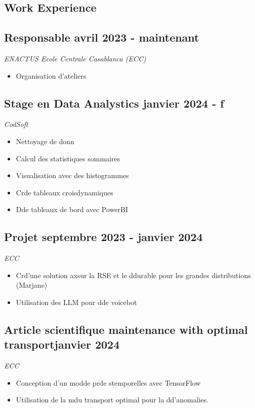\documentclass[a4paper,10pt]{article}
\begin{document}
\begin{multicols}{2}
\section*{ Work Experience}

\subsection*{Responsable \ufffdv\ufffdnementiel \hfill avril 2023 - maintenant}
\textit{ENACTUS Ecole Centrale Casablanca (ECC)}
\begin{itemize}
    \item Organisation d'ateliers
\end{itemize}

\subsection*{Stage en Data Analystics \hfill janvier 2024 - f}
\textit{CodSoft}
\begin{itemize}
    \item Nettoyage de donn\ufffdes
    \item Calcul des statistiques sommaires
    \item Visualisation avec des histogrammes
    \item Cr\ufffdation de tableaux crois\ufffds dynamiques
    \item D\ufffdveloppement de tableaux de bord avec PowerBI
\end{itemize}

\subsection*{Projet \ufffdGreenVoice\ufffd \hfill septembre 2023 - janvier 2024}
\textit{ECC}
\begin{itemize}
    \item Cr\ufffdation d'une solution ax\ufffde sur la RSE et le d\ufffdveloppement durable pour les grandes distributions (Marjane)
    \item Utilisation des LLM pour d\ufffdveloppement de voicebot
\end{itemize}

\subsection*{Article scientifique \ufffdPredictive maintenance with optimal transport\ufffd \hfill janvier 2024}
\textit{ECC}
\begin{itemize}
    \item Conception d'un mod\ufffdle de pr\ufffdvision de s\ufffdries temporelles avec TensorFlow
    \item Utilisation de la m\ufffdthode du transport optimal pour la d\ufffdtection d'anomalies.
\end{itemize}


\end{multicols}
\end{document}
